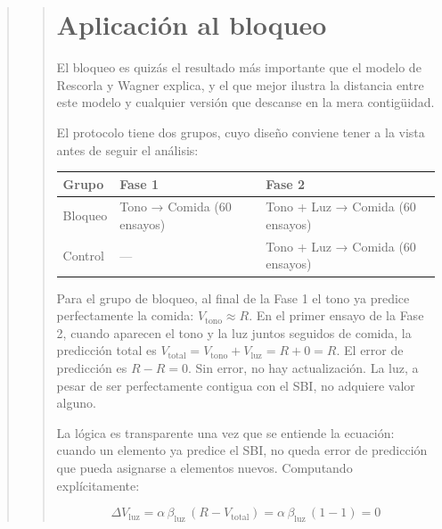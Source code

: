 \documentclass[
  letterpaper,
  DIV=11,
  numbers=noendperiod]{scrreprt}
\begin{document}
\begin{tcolorbox}[enhanced jigsaw, toprule=.15mm, arc=.35mm, colback=white, opacityback=0, colframe=quarto-callout-note-color-frame, breakable, rightrule=.15mm, left=2mm, leftrule=.75mm, bottomrule=.15mm]
\begin{quote}
\begin{quote}
\section{Aplicación al bloqueo}\label{aplicaciuxf3n-al-bloqueo}

El bloqueo es quizás el resultado más importante que el modelo de
Rescorla y Wagner explica, y el que mejor ilustra la distancia entre
este modelo y cualquier versión que descanse en la mera contigüidad.

El protocolo tiene dos grupos, cuyo diseño conviene tener a la vista
antes de seguir el análisis:

\begin{longtable}[]{@{}
  >{\raggedright\arraybackslash}p{}
  >{\raggedright\arraybackslash}p{}
  >{\raggedright\arraybackslash}p{}@{}}
\toprule\noalign{}
\begin{minipage}[b]{\linewidth}\raggedright
Grupo
\end{minipage} & \begin{minipage}[b]{\linewidth}\raggedright
Fase 1
\end{minipage} & \begin{minipage}[b]{\linewidth}\raggedright
Fase 2
\end{minipage} \\
\midrule\noalign{}
\endhead
\bottomrule\noalign{}
\endlastfoot
Bloqueo & Tono → Comida (60 ensayos) & Tono + Luz → Comida (60
ensayos) \\
Control & --- & Tono + Luz → Comida (60 ensayos) \\
\end{longtable}

Para el grupo de bloqueo, al final de la Fase 1 el tono ya predice
perfectamente la comida: \(V_{\text{tono}} \approx R\). En el primer
ensayo de la Fase 2, cuando aparecen el tono y la luz juntos seguidos de
comida, la predicción total es
\(V_{\text{total}} = V_{\text{tono}} + V_{\text{luz}} = R + 0 = R\). El
error de predicción es \(R - R = 0\). Sin error, no hay actualización.
La luz, a pesar de ser perfectamente contigua con el SBI, no adquiere
valor alguno.

La lógica es transparente una vez que se entiende la ecuación: cuando un
elemento ya predice el SBI, no queda error de predicción que pueda
asignarse a elementos nuevos. Computando explícitamente:

\[\Delta V_{\text{luz}} = \alpha\,\beta_{\text{luz}}\,(R - V_{\text{total}}) = \alpha\,\beta_{\text{luz}}\,(1 - 1) = 0\]


\end{quote}
\end{quote}
\end{tcolorbox}
\end{document}
